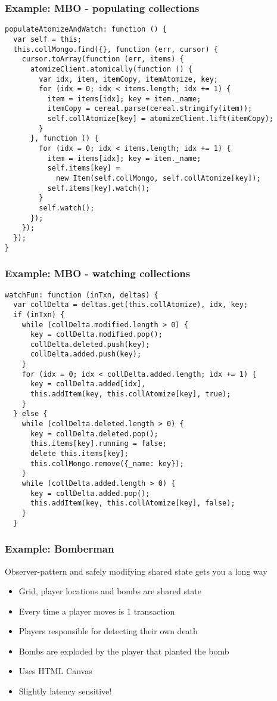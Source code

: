 \documentclass{beamer}
\begin{document}
\begin{frame}[fragile]
  \frametitle{Example: MBO - populating collections}
  \footnotesize
  \begin{verbatim}
populateAtomizeAndWatch: function () {
  var self = this;
  this.collMongo.find({}, function (err, cursor) {
    cursor.toArray(function (err, items) {
      atomizeClient.atomically(function () {
        var idx, item, itemCopy, itemAtomize, key;
        for (idx = 0; idx < items.length; idx += 1) {
          item = items[idx]; key = item._name;
          itemCopy = cereal.parse(cereal.stringify(item));
          self.collAtomize[key] = atomizeClient.lift(itemCopy);
        }
      }, function () {
        for (idx = 0; idx < items.length; idx += 1) {
          item = items[idx]; key = item._name;
          self.items[key] =
            new Item(self.collMongo, self.collAtomize[key]);
          self.items[key].watch();
        }
        self.watch();
      });
    });
  });
}
  \end{verbatim}
\end{frame}

\begin{frame}[fragile]
  \frametitle{Example: MBO - watching collections}
  \scriptsize
  \begin{verbatim}
watchFun: function (inTxn, deltas) {
  var collDelta = deltas.get(this.collAtomize), idx, key;
  if (inTxn) {
    while (collDelta.modified.length > 0) {
      key = collDelta.modified.pop();
      collDelta.deleted.push(key);
      collDelta.added.push(key);
    }
    for (idx = 0; idx < collDelta.added.length; idx += 1) {
      key = collDelta.added[idx],
      this.addItem(key, this.collAtomize[key], true);
    }
  } else {
    while (collDelta.deleted.length > 0) {
      key = collDelta.deleted.pop();
      this.items[key].running = false;
      delete this.items[key];
      this.collMongo.remove({_name: key});
    }
    while (collDelta.added.length > 0) {
      key = collDelta.added.pop();
      this.addItem(key, this.collAtomize[key], false);
    }
  }
  \end{verbatim}
\end{frame}

\begin{frame}
  \frametitle{Example: Bomberman}

  \begin{block}{Observer-pattern and safely modifying shared state gets you a long way}
    \begin{itemize}
    \item
      Grid, player locations and bombs are shared state
    \item
      Every time a player moves is 1 transaction
    \item
      Players responsible for detecting their own death
    \item
      Bombs are exploded by the player that planted the bomb
    \item
      Uses HTML Canvas
    \item
      Slightly latency sensitive!
    \end{itemize}
  \end{block}
\end{frame}
\end{document}
